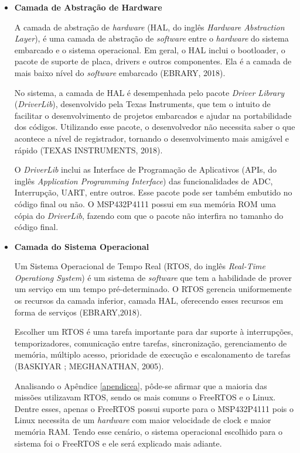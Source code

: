 \begin{itemize}
\item \textbf{Camada de Abstração de Hardware} 

A camada de abstração de \textit{hardware} (HAL, do inglês \textit{Hardware Abstraction Layer}), é uma camada de abstração de \textit{software} entre o \textit{hardware} do sistema embarcado e o sistema operacional. Em geral, o HAL inclui o bootloader, o pacote de suporte de placa, drivers e outros componentes. Ela é a camada de mais baixo nível do \textit{software} embarcado (EBRARY, 2018).

No sistema, a camada de HAL é desempenhada pelo pacote \textit{Driver Library} (\textit{DriverLib}), desenvolvido pela Texas Instruments, que tem o intuito de facilitar o desenvolvimento de projetos embarcados e ajudar na portabilidade dos códigos. Utilizando esse pacote, o desenvolvedor não necessita saber o que acontece a nível de registrador, tornando o desenvolvimento mais amigável e rápido  (TEXAS INSTRUMENTS, 2018).

O \textit{DriverLib} inclui as Interface de Programação de Aplicativos (APIs, do inglês \textit{Application Programming Interface}) das funcionalidades de ADC, Interrupção, UART, entre outros. Esse pacote pode ser também embutido no código final ou não. O MSP432P4111 possui em sua memória ROM uma cópia do \textit{DriverLib}, fazendo com que o pacote não interfira no tamanho do código final.

\item \textbf{Camada do Sistema Operacional}

Um Sistema Operacional de Tempo Real (RTOS, do inglês \textit{Real-Time Operationg System}) é um sistema de \textit{software} que tem a habilidade de prover um serviço em um tempo pré-determinado. O RTOS gerencia uniformemente os recursos da camada inferior, camada HAL, oferecendo esses recursos em forma de serviços (EBRARY,2018).

Escolher um RTOS é uma tarefa importante para dar suporte à interrupções, temporizadores, comunicação entre tarefas, sincronização, gerenciamento de memória, múltiplo acesso, prioridade de execução e escalonamento de tarefas (BASKIYAR ; MEGHANATHAN, 2005).

Analisando o Apêndice \ref{apendicea}, pôde-se afirmar que a maioria das missões utilizavam RTOS, sendo os mais comuns o FreeRTOS e o Linux. Dentre esses, apenas o FreeRTOS possui suporte para o MSP432P4111 pois o Linux necessita de um \textit{hardware} com maior velocidade de clock e maior memória RAM. Tendo esse cenário, o sistema operacional escolhido para o sistema foi o FreeRTOS e ele será explicado mais adiante. 


\end{itemize}
